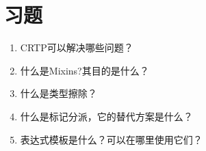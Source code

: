 \section{习题}
\begin{enumerate}
\item
CRTP可以解决哪些问题？

\item
什么是Mixins?其目的是什么？

\item
什么是类型擦除？

\item
什么是标记分派，它的替代方案是什么？

\item
表达式模板是什么？可以在哪里使用它们？
\end{enumerate}